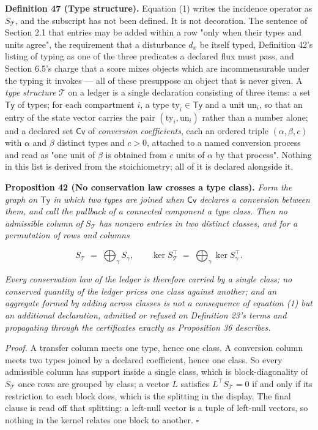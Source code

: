 \documentclass[11pt]{article}
\begin{document}
\textbf{Definition 47 (Type structure).} Equation (1) writes the incidence operator as \(S_{\mathcal{T}}\), and the subscript has not been defined. It is not decoration. The sentence of Section 2.1 that entries may be added within a row "only when their types and units agree", the requirement that a disturbance \(d_x\) be itself typed, Definition 42's listing of typing as one of the three predicates a declared flux must pass, and Section 6.5's charge that a score mixes objects which are incommensurable under the typing it invokes --- all of these presuppose an object that is never given. A \emph{type structure} \(\mathcal{T}\) on a ledger is a single declaration consisting of three items: a set \(\mathsf{Ty}\) of types; for each compartment \(i\), a type \(\mathrm{ty}_i \in \mathsf{Ty}\) and a unit \(\mathrm{un}_i\), so that an entry of the state vector carries the pair \((\mathrm{ty}_i,\allowbreak{} \mathrm{un}_i)\) rather than a number alone; and a declared set \(\mathsf{Cv}\) of \emph{conversion coefficients}, each an ordered triple \((\alpha, \beta, c)\) with \(\alpha\) and \(\beta\) distinct types and \(c > 0\), attached to a named conversion process and read as "one unit of \(\beta\) is obtained from \(c\) units of \(\alpha\) by that process". Nothing in this list is derived from the stoichiometry; all of it is declared alongside it.

\textbf{Proposition 42 (No conservation law crosses a type class).} \emph{Form the graph on \(\mathsf{Ty}\) in which two types are joined when \(\mathsf{Cv}\) declares a conversion between them, and call the pullback of a connected component a type class. Then no admissible column of \(S_{\mathcal{T}}\) has nonzero entries in two distinct classes, and for a permutation of rows and columns} 

$$S_{\mathcal{T}} \;=\; \bigoplus_{\gamma} S_{\gamma}, \qquad \ker S_{\mathcal{T}}^{\top} \;=\; \bigoplus_{\gamma} \ker S_{\gamma}^{\top} .$$

 \emph{Every conservation law of the ledger is therefore carried by a single class; no conserved quantity of the ledger prices one class against another; and an aggregate formed by adding across classes is not a consequence of equation (1) but an additional declaration, admitted or refused on Definition 23's terms and propagating through the certificates exactly as Proposition 36 describes.}

\emph{Proof.} A transfer column meets one type, hence one class. A conversion column meets two types joined by a declared coefficient, hence one class. So every admissible column has support inside a single class, which is block-diagonality of \(S_{\mathcal{T}}\) once rows are grouped by class; a vector \(L\) satisfies \(L^{\top} S_{\mathcal{T}} = 0\) if and only if its restriction to each block does, which is the splitting in the display. The final clause is read off that splitting: a left-null vector is a tuple of left-null vectors, so nothing in the kernel relates one block to another. \(\square\)
\end{document}
